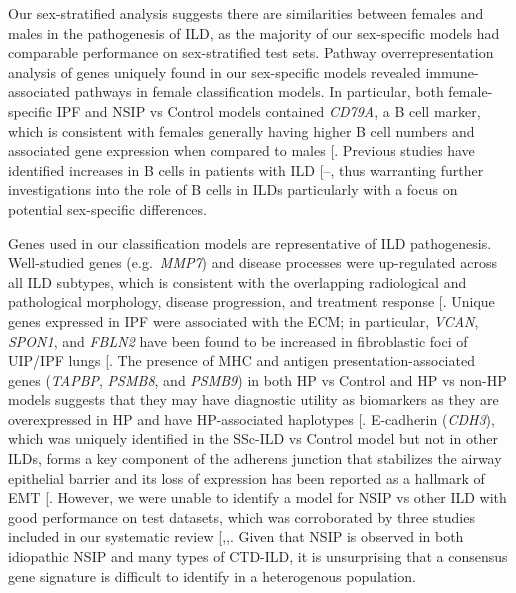 \documentclass[
]{article}
\begin{document}
Our sex-stratified analysis suggests there are similarities between females and males in the pathogenesis of ILD, as the majority of our sex-specific models had comparable performance on sex-stratified test sets. Pathway overrepresentation analysis of genes uniquely found in our sex-specific models revealed immune-associated pathways in female classification models. In particular, both female-specific IPF and NSIP vs Control models contained \textit{CD79A}, a B cell marker, which is consistent with females generally having higher B cell numbers and associated gene expression when compared to males {[}\citeproc{ref-klein_sex_2016}{90}{]}. Previous studies have identified increases in B cells in patients with ILD {[}--\citeproc{ref-schiller_deep_2017}{93}{]}, thus warranting further investigations into the role of B cells in ILDs particularly with a focus on potential sex-specific differences.

Genes used in our classification models are representative of ILD pathogenesis. Well-studied genes (e.g.~\textit{MMP7}) and disease processes were up-regulated across all ILD subtypes, which is consistent with the overlapping radiological and pathological morphology, disease progression, and treatment response {[}\citeproc{ref-flaherty_nintedanib_2019}{19}{]}. Unique genes expressed in IPF were associated with the ECM; in particular, \textit{VCAN}, \textit{SPON1}, and \textit{FBLN2} have been found to be increased in fibroblastic foci of UIP/IPF lungs {[}\citeproc{ref-herrera_uipipf_2022}{91}{]}. The presence of MHC and antigen presentation-associated genes (\textit{TAPBP}, \textit{PSMB8}, and \textit{PSMB9}) in both HP vs Control and HP vs non-HP models suggests that they may have diagnostic utility as biomarkers as they are overexpressed in HP and have HP-associated haplotypes {[}\citeproc{ref-camarena_psmb8_2010}{94}{]}. E-cadherin (\textit{CDH3}), which was uniquely identified in the SSc-ILD vs Control model but not in other ILDs, forms a key component of the adherens junction that stabilizes the airway epithelial barrier and its loss of expression has been reported as a hallmark of EMT {[}\citeproc{ref-bartis_epithelialmesenchymal_2014}{95}{]}. However, we were unable to identify a model for NSIP vs other ILD with good performance on test datasets, which was corroborated by three studies included in our systematic review {[},,\citeproc{ref-horimasu_gene_2017}{83}{]}. Given that NSIP is observed in both idiopathic NSIP and many types of CTD-ILD, it is unsurprising that a consensus gene signature is difficult to identify in a heterogenous population.
\end{document}
